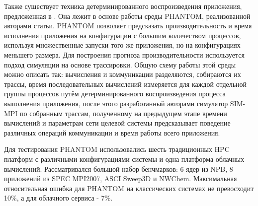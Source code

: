 		Также существует техника детерминированного воспроизведения приложения, предложенная в \cite{representative_replay}. Она лежит в основе работы среды PHANTOM, реализованной авторами статьи. PHANTOM позволяет предсказать производительность и время исполнения приложения на конфигурации с большим количеством процессов, используя множественные запуски того же приложения, но на конфигурациях меньшего размера. Для построения прогноза производительности используется подход симуляции на основе трассировки. Общую схему работы этой среды можно описать так: вычисления и коммуникации разделяются, собираются их трассы, время последовательных вычислений измеряется для каждой отдельной группы процессов путём детерминированного воспроизведения процесса выполнения приложения, после этого разработанный авторами симулятор SIM-MPI по собранным трассам, полученному на предыдущем этапе времени вычислений и параметрам сети целевой системы предсказывает поведение различных операций коммуникации и время работы всего приложения.

		Для тестирования PHANTOM использовались шесть традиционных HPC платформ с различными конфигурациями системы и одна платформа облачных вычислений. Рассматривался большой набор бенчмарков: 6 ядер из NPB, 8 приложений из SPEC MPI2007, ASCI Sweep3D и NWChem. Максимальная относительная ошибка для PHANTOM на классических системах не превосходит 10\%, а для облачного сервиса - 7\%.

